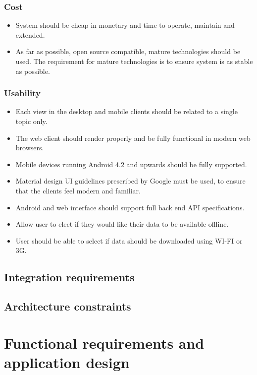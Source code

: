 \documentclass[a4paper,10pt]{article}
\begin{document}
\subsubsection{Cost}
\begin{itemize}
\item System should be cheap in monetary and time to operate, maintain and extended.
\item As far as possible, open source compatible, mature technologies should be used. The requirement for mature technologies is to ensure system is as stable as possible.
\end{itemize}

\subsubsection{Usability}
\begin{itemize}
\item Each view in the desktop and mobile clients should be related to a single topic only.
\item The web client should render properly and be fully functional in modern web browsers.
\item Mobile devices running Android 4.2 and upwards should be fully supported.
\item Material design UI guidelines prescribed by Google must be used, to ensure that the clients feel modern and familiar. 
\item Android and web interface should support full back end API specifications.
\item Allow user to elect if they would like their data to be available offline.
\item User should be able to select if data should be downloaded using WI-FI or 3G. 
\end{itemize}

\subsection{Integration requirements}

\subsection{Architecture constraints}

\section{Functional requirements and application design}
\end{document}
